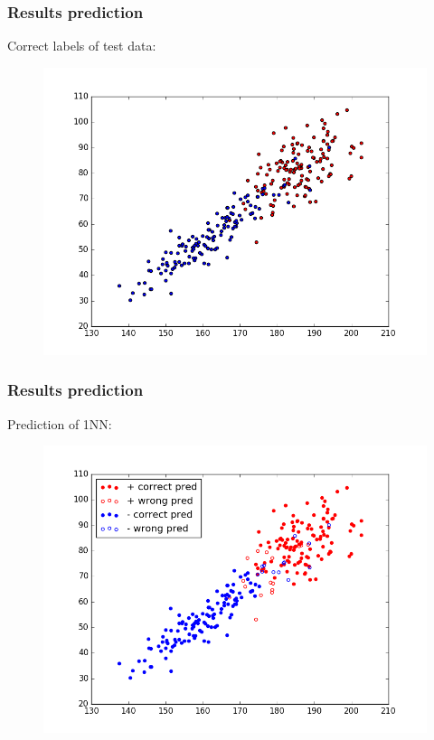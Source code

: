 \documentclass{beamer}
\begin{document}
\begin{frame}
\frametitle{Results prediction}
	Correct labels of test data:
	\begin{figure}
	\includegraphics[height=0.8\textheight]{graphics/testWithCorrect}
	\end{figure}
\end{frame} 

\begin{frame}
\frametitle{Results prediction}
Prediction of 1NN:
\begin{figure}
	\includegraphics[height=0.8\textheight]{graphics/1NNPrediction}
\end{figure}
\end{frame} 
\end{document}
